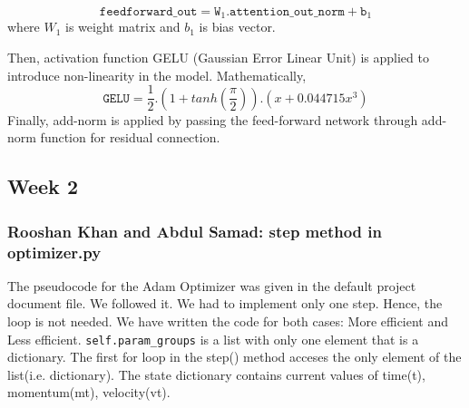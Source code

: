 \documentclass{article}
\begin{document}
\begin{equation} \label{eqn5}
\texttt{feedforward\_out}=\texttt{W}_1.\texttt{attention\_out\_norm}+\texttt{b}_1
\end{equation}
where 
$W_1$ is weight matrix and $b_1$ is bias vector. 

Then, activation function GELU (Gaussian Error Linear Unit) is applied to introduce non-linearity in the model. Mathematically,
\begin{equation} \label{eqn6}
\texttt{GELU}=\frac{1}{2}.(1+tanh(\frac{\pi}{2})).(x+0.044715x^3)
\end{equation}
Finally, add-norm is applied by passing the feed-forward network through add-norm function for residual connection.
\subsection{Week 2}
\subsubsection{Rooshan Khan and Abdul Samad: step method in optimizer.py}
The pseudocode for the Adam Optimizer was given in the default project document file. We followed it. We had to implement only one step. Hence, the loop is not needed. We have written the code for both cases: More efficient and Less efficient. \texttt{self.param\_groups} is a list with only one element that is a dictionary. The first for loop in the step() method acceses the only element of the list(i.e. dictionary). The state dictionary contains current values of time(t), momentum(mt), velocity(vt).
\end{document}
